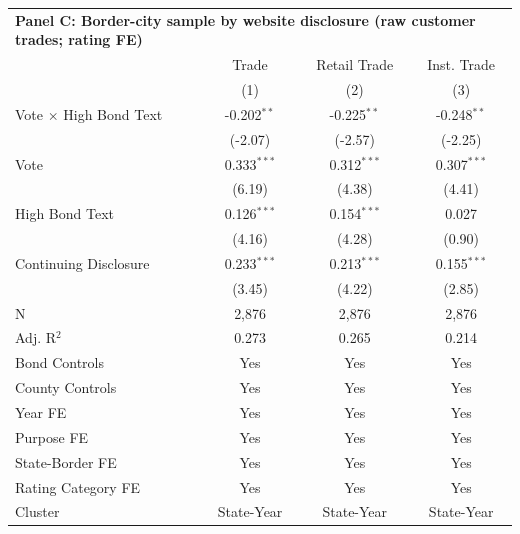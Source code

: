 \begingroup
\centering
\begin{tabular*}{\textwidth}{@{\extracolsep{\fill}}lccc}
\multicolumn{5}{l}{\textbf{Panel C: Border-city sample by website disclosure (raw customer trades; rating FE)}}\\

\addlinespace
   \toprule
                                 & Trade         & Retail Trade  & Inst. Trade\\  
                                 & (1)           & (2)           & (3)\\  
   \midrule 
   Vote $\times$ High Bond Text  & -0.202$^{**}$ & -0.225$^{**}$ & -0.248$^{**}$\\   
                                 & (-2.07)      & (-2.57)      & (-2.25)\\   
   Vote                          & 0.333$^{***}$ & 0.312$^{***}$ & 0.307$^{***}$\\   
                                 & (6.19)       & (4.38)       & (4.41)\\   
   High Bond Text                & 0.126$^{***}$ & 0.154$^{***}$ & 0.027\\   
                                 & (4.16)       & (4.28)       & (0.90)\\   
   Continuing Disclosure         & 0.233$^{***}$ & 0.213$^{***}$ & 0.155$^{***}$\\   
                                 & (3.45)       & (4.22)       & (2.85)\\   
   \hline
   N                  & 2,876         & 2,876         & 2,876\\  
   Adj. R$^2$                & 0.273         & 0.265         & 0.214\\  
   Bond Controls                 & Yes           & Yes           & Yes\\  
   County Controls               & Yes           & Yes           & Yes\\  
   Year FE                       & Yes           & Yes           & Yes\\  
   Purpose FE                    & Yes           & Yes           & Yes\\  
   State-Border FE               & Yes           & Yes           & Yes\\  
   Rating Category FE            & Yes           & Yes           & Yes\\  
   Cluster              & State-Year & State-Year & State-Year\\  
   \bottomrule
\end{tabular*}
\par\endgroup
